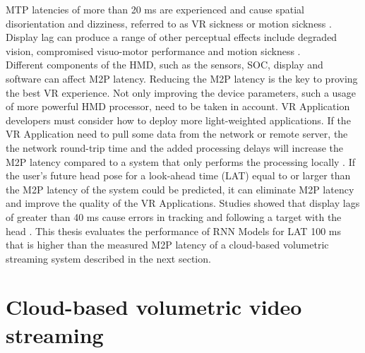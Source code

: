 MTP latencies of more than 20 ms are experienced and cause spatial disorientation and dizziness, referred to as VR sickness or motion sickness \cite{delay_sickness, serhan_kalman}. Display lag can produce a range of other perceptual effects include degraded vision, compromised visuo-motor performance and motion sickness \cite{delay_sickness}.\\
Different components of the HMD, such as the sensors, SOC, display and software can affect M2P latency. Reducing the M2P latency is the key to proving the best VR experience. Not only improving the device parameters, such a usage of more powerful HMD processor, need to be taken in account. VR Application developers must consider how to deploy more light-weighted applications. If the VR Application need to pull some data from the network or remote server, the the network round-trip time and the added processing delays will increase the M2P latency compared to a system that only performs the processing locally \cite{serhan_kalman}. If the user’s future head pose for a look-ahead time (LAT) equal to or larger than the M2P latency of the system could be predicted, it can eliminate M2P latency and improve the quality of the VR Applications. Studies showed that display lags of greater than 40 ms cause errors in tracking and following a target with the head \cite{delay_sickness}. This thesis evaluates the performance of RNN Models for LAT 100 ms that is higher than the measured M2P latency of a cloud-based volumetric streaming system described in the next section. 

\section{Cloud-based volumetric video streaming}
\label{sec:theorie:cloud}

